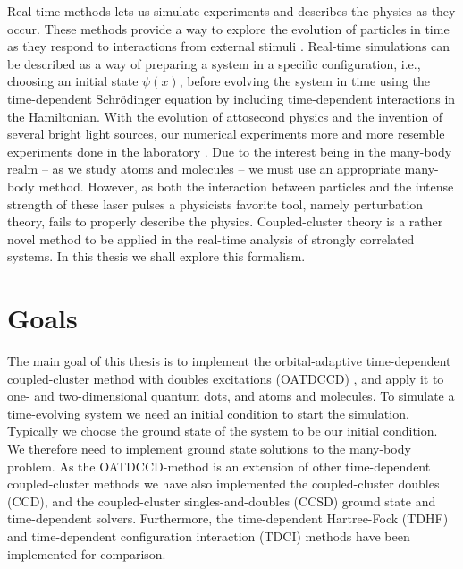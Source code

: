     Real-time methods lets us simulate experiments and describes the physics as
    they occur.
    These methods provide a way to explore the evolution of particles in time as
    they respond to interactions from external stimuli \cite{joshua-magnus}.
    Real-time simulations can be described as a way of preparing a system in a
    specific configuration, i.e., choosing an initial state $\psi(x)$, before
    evolving the system in time using the time-dependent Schrödinger equation by
    including time-dependent interactions in the Hamiltonian.
    With the evolution of attosecond physics and the invention of several bright
    light sources, our numerical experiments more and more resemble experiments
    done in the laboratory \cite{joachain2012atoms}.
    Due to the interest being in the many-body realm -- as we study atoms and
    molecules -- we must use an appropriate many-body method.
    However, as both the interaction between particles and the intense strength
    of these laser pulses a physicists favorite tool, namely perturbation
    theory, fails to properly describe the physics.
    Coupled-cluster theory is a rather novel method to be applied in the
    real-time analysis of strongly correlated systems.
    In this thesis we shall explore this formalism.


    \section{Goals}
        The main goal of this thesis is to implement the orbital-adaptive
        time-dependent coupled-cluster method with doubles excitations (OATDCCD)
        \cite{kvaal2012ab}, and apply it to one- and two-dimensional quantum
        dots, and atoms and molecules.
        To simulate a time-evolving system we need an initial condition to start
        the simulation.
        Typically we choose the ground state of the system to be our initial
        condition.
        We therefore need to implement ground state solutions to the many-body
        problem.
        As the OATDCCD-method is an extension of other time-dependent
        coupled-cluster methods we have also implemented the coupled-cluster
        doubles (CCD), and the coupled-cluster singles-and-doubles (CCSD) ground
        state and time-dependent solvers.
        Furthermore, the time-dependent Hartree-Fock (TDHF) and time-dependent
        configuration interaction (TDCI) methods have been implemented for
        comparison.

